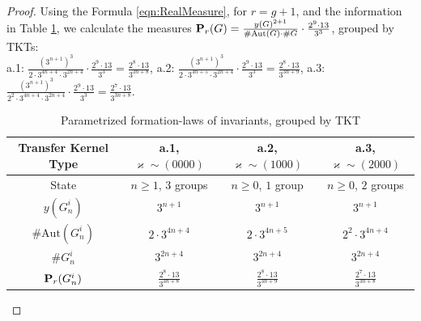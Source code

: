 \documentclass{amsart}
\theoremstyle{definition}
\theoremstyle{remark}
\begin{document}
\begin{proof}
Using the Formula
\eqref{eqn:RealMeasure},
for \(r=g+1\),
and the information in Table
\ref{tbl:FormationLawsOne},
we calculate the measures
\({\bf P}_r(G)=\frac{y(G)^{2+1}}{\#\mathrm{Aut}(G)\cdot\#G}\cdot\frac{2^9\cdot 13}{3^3}\), grouped by TKTs: \\
a.1: \(\frac{(3^{n+1})^3}{2\cdot 3^{4n+4}\cdot 3^{2n+4}}\cdot\frac{2^9\cdot 13}{3^3}=\frac{2^8\cdot 13}{3^{3n+8}}\),
a.2: \(\frac{(3^{n+1})^3}{2\cdot 3^{4n+5}\cdot 3^{2n+4}}\cdot\frac{2^9\cdot 13}{3^3}=\frac{2^8\cdot 13}{3^{3n+9}}\),
a.3: \(\frac{(3^{n+1})^3}{2^2\cdot 3^{4n+4}\cdot 3^{2n+4}}\cdot\frac{2^9\cdot 13}{3^3}=\frac{2^7\cdot 13}{3^{3n+8}}\).

\renewcommand{\arraystretch}{1.2}
\begin{table}[ht]
\caption{Parametrized formation-laws of invariants, grouped by TKT}
\label{tbl:FormationLawsOne}
\begin{center}
\begin{tabular}{|c||c|c|c|}
\hline
 Transfer Kernel Type      & a.1, \(\varkappa\sim (0000)\)    &  a.2, \(\varkappa\sim (1000)\)   &  a.3, \(\varkappa\sim (2000)\)   \\
\hline
 State                     & \(n\ge 1\), \(3\) groups         & \(n\ge 0\), \(1\) group          & \(n\ge 0\), \(2\) groups         \\
 \(y(G_n^i)\)              & \(3^{n+1}\)                      & \(3^{n+1}\)                      & \(3^{n+1}\)                      \\
 \(\#\mathrm{Aut}(G_n^i)\) & \(2\cdot 3^{4n+4}\)              & \(2\cdot 3^{4n+5}\)              & \(2^2\cdot 3^{4n+4}\)            \\
 \(\#G_n^i\)               & \(3^{2n+4}\)                     & \(3^{2n+4}\)                     & \(3^{2n+4}\)                     \\
 \({\bf P}_r(G_n^i)\)      & \(\frac{2^8\cdot 13}{3^{3n+8}}\) & \(\frac{2^8\cdot 13}{3^{3n+9}}\) & \(\frac{2^7\cdot 13}{3^{3n+8}}\) \\
\hline
\end{tabular}
\end{center}
\end{table}


\end{proof}
\end{document}
